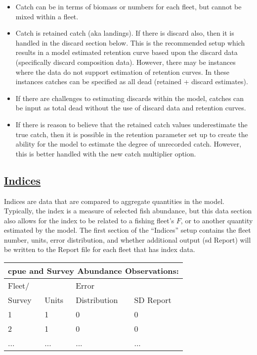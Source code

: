 \begin{itemize}
	\item Catch can be in terms of biomass or numbers for each fleet, but cannot be mixed within a fleet.
	\item Catch is retained catch (aka landings). If there is discard also, then it is handled in the discard section below. This is the recommended setup which results in a model estimated retention curve based upon the discard data (specifically discard composition data). However, there may be instances where the data do not support estimation of retention curves. In these instances catches can be specified as all dead (retained + discard estimates).
	\item If there are challenges to estimating discards within the model, catches can be input as total dead without the use of discard data and retention curves.
	\item If there is reason to believe that the retained catch values underestimate the true catch, then it is possible in the retention parameter set up to create the ability for the model to estimate the degree of unrecorded catch. However, this is better handled with the new catch multiplier option.
\end{itemize}

\hypertarget{Indices}{}
\subsection[Indices]{\protect\hyperlink{Indices}{Indices}}
Indices are data that are compared to aggregate quantities in the model. Typically, the index is a measure of selected fish abundance, but this data section also allows for the index to be related to a fishing fleet's $F$, or to another quantity estimated by the model. The first section of the ``Indices'' setup contains the fleet number, units, error distribution, and whether additional output (\gls{sd} Report) will be written to the Report file for each fleet that has index data.

\begin{center}
	\begin{tabular}{p{3cm} p{3cm} p{4cm} p{4cm}}
		\multicolumn{4}{l}{\gls{cpue} and Survey Abundance Observations:} \\
		\hline
		Fleet/ &       & Error        & \Tstrut\\
		Survey & Units & Distribution & SD Report \Bstrut\\
		\hline
		1 & 1 & 0 & 0 \Tstrut\\
		2 & 1 & 0 & 0 \\
		... & ... & ... & ... \Bstrut\\
		\hline
	\end{tabular}		
\end{center}


